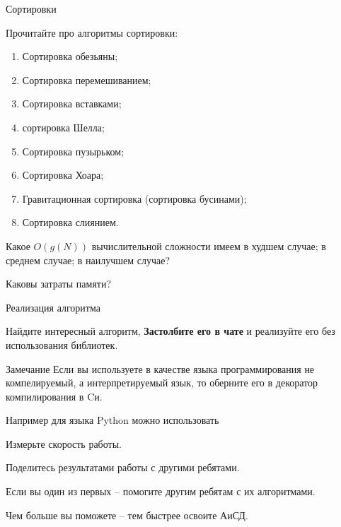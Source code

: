 \begin{frame}{Сортировки}
	
	Прочитайте про алгоритмы сортировки:
	\begin{enumerate}
		\item Сортировка обезьяны;
		\item Сортировка перемешиванием;
		\item Сортировка вставками;
		\item сортировка Шелла;
		\item Сортировка пузырьком;
		\item Сортировка Хоара;
		\item Гравитационная сортировка (сортировка бусинами);
		\item Сортировка слиянием.
	\end{enumerate}
	
	Какое $O(g(N))$ вычислительной сложности
	имеем 
	в худшем случае; 
	в среднем случае; 
	в наилучшем случае?
	
	Каковы затраты памяти?
	
	
\end{frame}


\begin{frame}{Реализация алгоритма}
	
	Найдите интересный алгоритм, 	\textbf{Застолбите его в чате} и реализуйте его без использования библиотек.
	

	
	\begin{block}{Замечание}
		Если вы используете в качестве языка программирования не компелируемый, а интерпретируемый язык,
		то оберните его в декоратор компилирования в Cи.
		
		Например для языка Python можно использовать 
	\end{block}
	
	Измерьте скорость работы.
	
	Поделитесь результатами работы с другими ребятами.
	
	Если вы один из первых -- помогите другим ребятам с их алгоритмами.
	
	Чем больше вы поможете -- тем быстрее освоите АиСД.
	
	
\end{frame}



